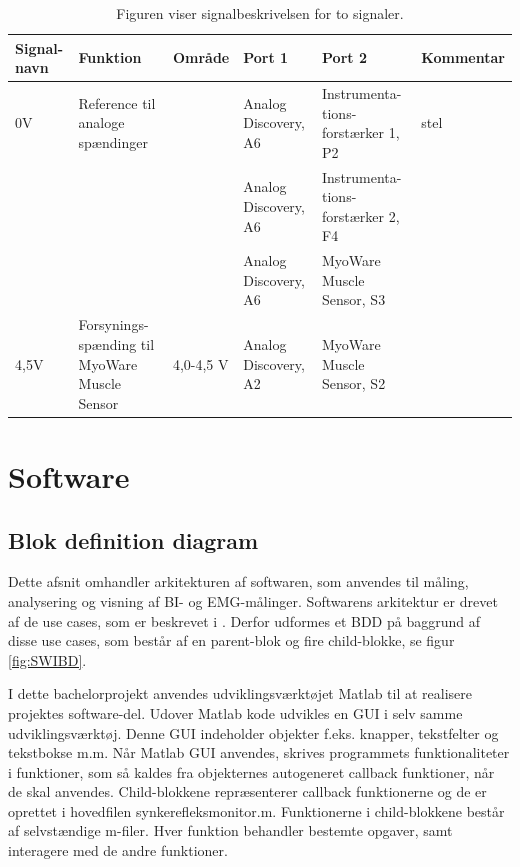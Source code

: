 \begin{table}[H]
\centering
\begin{tabularx}{\textwidth}{l|X|X|X|X|X}
\hline

\textbf{Signal-navn}  & \textbf{Funktion}  & \textbf{Område} & \textbf{Port 1}      & \textbf{Port 2}  & \textbf{Kommentar} \\ \cline{4-6} \hline


0V & Reference til analoge spændinger  &   & Analog Discovery, A6  & Instrumenta-tions-forstærker 1, P2  &  stel   \\ \cline{4-6}

 &  &   &  Analog Discovery, A6 & Instrumenta-tions-forstærker 2, F4 & \\ \cline{4-6} 
 
 &  &   &  Analog Discovery, A6 & MyoWare Muscle Sensor, S3 & \\ \cline{4-6}

 \hline
4,5V & Forsynings- spænding til MyoWare Muscle Sensor  &  4,0-4,5 V & Analog Discovery, A2 & MyoWare Muscle Sensor, S2&     \\ \cline{4-6}	\hline

\end{tabularx}
\caption{Figuren viser signalbeskrivelsen for to signaler.}
\label{tab:signaltabel}
\end{table}



\section{Software}
\subsection{Blok definition diagram}

Dette afsnit omhandler arkitekturen af softwaren, som anvendes til måling, analysering og visning af BI- og EMG-målinger. Softwarens arkitektur er drevet af de use cases, som er beskrevet i . Derfor udformes et BDD på baggrund af disse use cases, som består af en parent-blok og fire child-blokke, se figur \ref{fig:SWIBD}. 

I dette bachelorprojekt anvendes udviklingsværktøjet Matlab til at realisere projektes software-del. Udover Matlab kode udvikles en GUI i selv samme udviklingsværktøj. Denne GUI indeholder objekter f.eks. knapper, tekstfelter og tekstbokse m.m. Når Matlab GUI anvendes, skrives programmets funktionaliteter i funktioner, som så kaldes fra objekternes autogeneret callback funktioner, når de skal anvendes. Child-blokkene repræsenterer callback funktionerne og de er oprettet i hovedfilen synkerefleksmonitor.m. Funktionerne i child-blokkene består af selvstændige m-filer. Hver funktion behandler bestemte opgaver, samt interagere med de andre funktioner.

